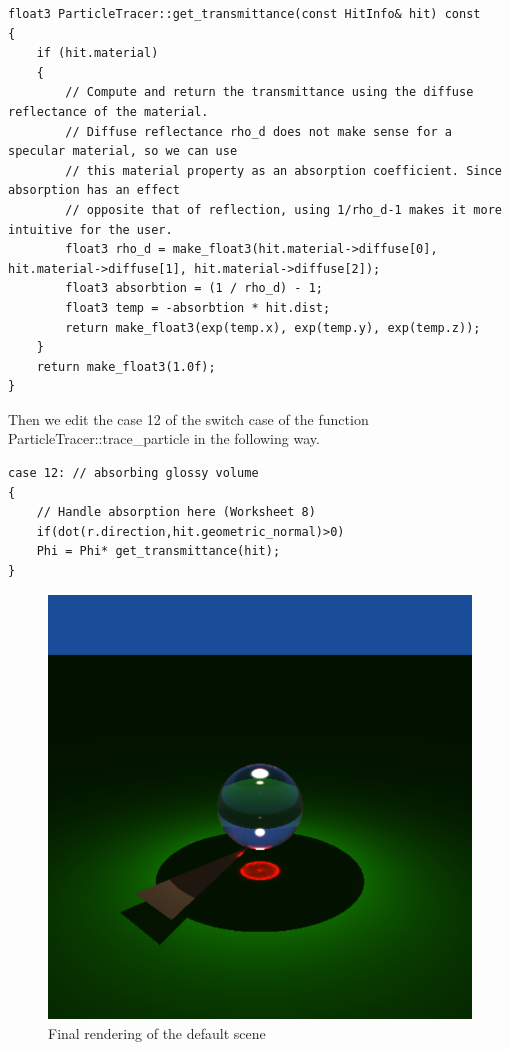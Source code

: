 \begin{lstlisting}
float3 ParticleTracer::get_transmittance(const HitInfo& hit) const
{
	if (hit.material)
	{
		// Compute and return the transmittance using the diffuse reflectance of the material.
		// Diffuse reflectance rho_d does not make sense for a specular material, so we can use 
		// this material property as an absorption coefficient. Since absorption has an effect
		// opposite that of reflection, using 1/rho_d-1 makes it more intuitive for the user.
		float3 rho_d = make_float3(hit.material->diffuse[0], hit.material->diffuse[1], hit.material->diffuse[2]);
		float3 absorbtion = (1 / rho_d) - 1;
		float3 temp = -absorbtion * hit.dist;
		return make_float3(exp(temp.x), exp(temp.y), exp(temp.z));
	}
	return make_float3(1.0f);   
}
\end{lstlisting}
Then we edit the case 12 of the switch case of the function ParticleTracer::trace\_particle in the following way.
\begin{lstlisting}
case 12: // absorbing glossy volume
{
	// Handle absorption here (Worksheet 8)
	if(dot(r.direction,hit.geometric_normal)>0)
	Phi = Phi* get_transmittance(hit);
}
\end{lstlisting}
\begin{figure}[H]
	\centering
	\includegraphics[scale=\imagescale]{images/worksheet_8/final}
	\caption{Final rendering of the default scene}
	\label{fig:final_default}
\end{figure}